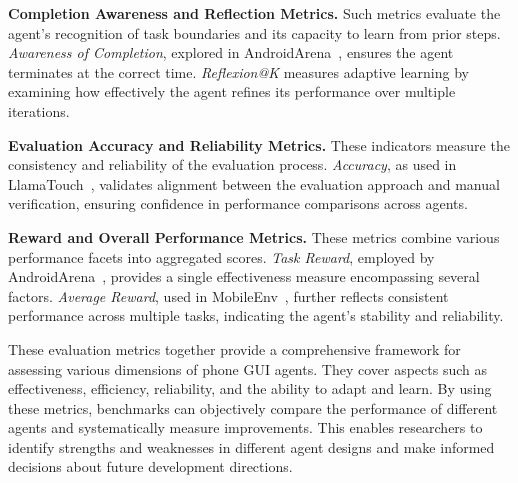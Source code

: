 \noindent\textbf{Completion Awareness and Reflection Metrics.}
Such metrics evaluate the agent’s recognition of task boundaries and its capacity to learn from prior steps. \emph{Awareness of Completion}, explored in AndroidArena~\cite{xing2024AndroidArena}, ensures the agent terminates at the correct time. \emph{Reflexion@K} measures adaptive learning by examining how effectively the agent refines its performance over multiple iterations.

\noindent\textbf{Evaluation Accuracy and Reliability Metrics.}
These indicators measure the consistency and reliability of the evaluation process. \emph{Accuracy}, as used in LlamaTouch~\cite{zhang2024llamatouch}, validates alignment between the evaluation approach and manual verification, ensuring confidence in performance comparisons across agents.

\noindent\textbf{Reward and Overall Performance Metrics.}
These metrics combine various performance facets into aggregated scores. \emph{Task Reward}, employed by AndroidArena~\cite{xing2024AndroidArena}, provides a single effectiveness measure encompassing several factors. \emph{Average Reward}, used in MobileEnv~\cite{zhang2023mobileenv}, further reflects consistent performance across multiple tasks, indicating the agent’s stability and reliability.

These evaluation metrics together provide a comprehensive framework for assessing various dimensions of phone GUI agents. They cover aspects such as effectiveness, efficiency, reliability, and the ability to adapt and learn. By using these metrics, benchmarks can objectively compare the performance of different agents and systematically measure improvements. This enables researchers to identify strengths and weaknesses in different agent designs and make informed decisions about future development directions.